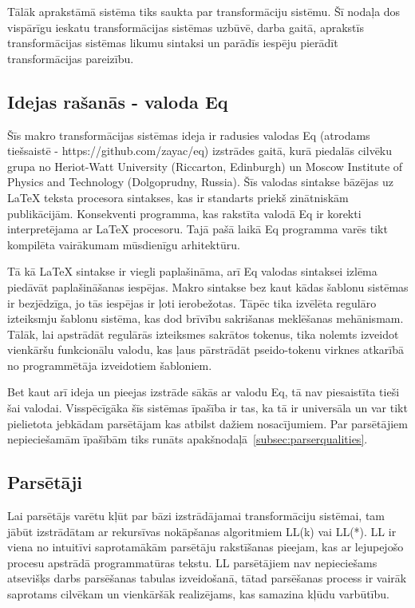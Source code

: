 Tālāk aprakstāmā sistēma tiks saukta par transformāciju sistēmu. Šī nodaļa dos vispārīgu ieskatu transformācijas sistēmas uzbūvē, darba gaitā, aprakstīs transformācijas sistēmas likumu sintaksi un parādīs iespēju pierādīt transformācijas pareizību.

\subsection{Idejas rašanās - valoda Eq}
Šīs makro transformācijas sistēmas ideja ir radusies valodas Eq (atrodams tiešsaistē - https://github.com/zayac/eq) izstrādes gaitā, kurā piedalās cilvēku grupa no Heriot-Watt University (Riccarton, Edinburgh) un Moscow Institute of Physics and Technology (Dolgoprudny, Russia). Šīs valodas sintakse bāzējas uz \LaTeX{} teksta procesora sintakses, kas ir standarts priekš zinātniskām publikācijām. Konsekventi programma, kas rakstīta valodā Eq ir korekti interpretējama ar \LaTeX{} procesoru. Tajā pašā laikā Eq programma varēs tikt kompilēta vairākumam mūsdienīgu arhitektūru. 

Tā kā \LaTeX{} sintakse ir viegli paplašināma, arī Eq valodas sintaksei izlēma piedāvāt paplašināšanas iespējas. Makro sintakse bez kaut kādas šablonu sistēmas ir bezjēdzīga, jo tās iespējas ir ļoti ierobežotas. Tāpēc tika izvēlēta regulāro izteiksmju šablonu sistēma, kas dod brīvību sakrišanas meklēšanas mehānismam. Tālāk, lai apstrādāt regulārās izteiksmes sakrātos tokenus, tika nolemts izveidot vienkāršu funkcionālu valodu, kas ļaus pārstrādāt pseido-tokenu virknes atkarībā no programmētāja izveidotiem šabloniem.

Bet kaut arī ideja un pieejas izstrāde sākās ar valodu Eq, tā nav piesaistīta tieši šai valodai. Visspēcīgāka šīs sistēmas īpašība ir tas, ka tā ir universāla un var tikt pielietota jebkādam parsētājam kas atbilst dažiem nosacījumiem. Par parsētājiem nepieciešamām īpašībām tiks runāts apakšnodaļā~\ref{subsec:parserqualities}.

\subsection{\label{subsec:parserqualities}Parsētāji}
Lai parsētājs varētu kļūt par bāzi izstrādājamai transformāciju sistēmai, tam jābūt izstrādātam ar rekursīvas nokāpšanas algoritmiem LL(k) vai LL(*). LL ir viena no intuitīvi saprotamākām parsētāju rakstīšanas pieejam, kas ar lejupejošo procesu apstrādā programmatūras tekstu. LL parsētājiem nav nepieciešams atsevišķs darbs parsēšanas tabulas izveidošanā, tātad parsēšanas process ir vairāk saprotams cilvēkam un vienkāršāk realizējams, kas samazina kļūdu varbūtību. 

